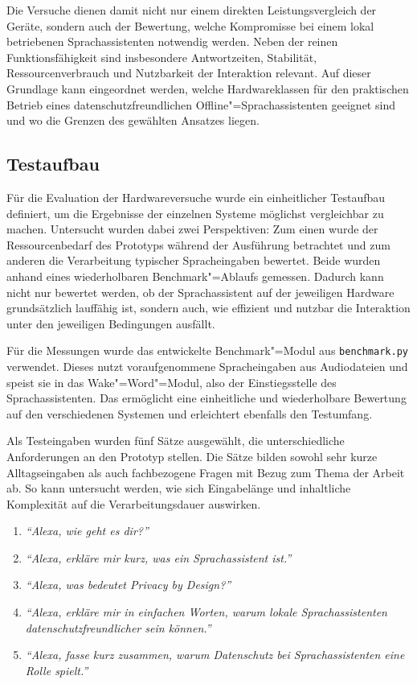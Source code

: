 Die Versuche dienen damit nicht nur einem direkten Leistungsvergleich der Geräte, sondern auch der Bewertung, welche Kompromisse bei einem lokal betriebenen Sprachassistenten notwendig werden. Neben der reinen Funktionsfähigkeit sind insbesondere Antwortzeiten, Stabilität, Ressourcenverbrauch und Nutzbarkeit der Interaktion relevant. Auf dieser Grundlage kann eingeordnet werden, welche Hardwareklassen für den praktischen Betrieb eines datenschutzfreundlichen Offline"=Sprachassistenten geeignet sind und wo die Grenzen des gewählten Ansatzes liegen.


\subsection{Testaufbau}
\label{subsec:Testaufbau}
Für die Evaluation der Hardwareversuche wurde ein einheitlicher Testaufbau definiert, um die Ergebnisse der einzelnen Systeme möglichst vergleichbar zu machen. Untersucht wurden dabei zwei Perspektiven: Zum einen wurde der Ressourcenbedarf des Prototyps während der Ausführung betrachtet und zum anderen die Verarbeitung typischer Spracheingaben bewertet. Beide wurden anhand eines wiederholbaren Benchmark"=Ablaufs gemessen. Dadurch kann nicht nur bewertet werden, ob der Sprachassistent auf der jeweiligen Hardware grundsätzlich lauffähig ist, sondern auch, wie effizient und nutzbar die Interaktion unter den jeweiligen Bedingungen ausfällt.

Für die Messungen wurde das entwickelte Benchmark"=Modul aus \texttt{benchmark.py} verwendet. Dieses nutzt voraufgenommene Spracheingaben aus Audiodateien und speist sie in das Wake"=Word"=Modul, also der Einstiegsstelle des Sprachassistenten. Das ermöglicht eine einheitliche und wiederholbare Bewertung auf den verschiedenen Systemen und erleichtert ebenfalls den Testumfang.

Als Testeingaben wurden fünf Sätze ausgewählt, die unterschiedliche Anforderungen an den Prototyp stellen. Die Sätze bilden sowohl sehr kurze Alltagseingaben als auch fachbezogene Fragen mit Bezug zum Thema der Arbeit ab. So kann untersucht werden, wie sich Eingabelänge und inhaltliche Komplexität auf die Verarbeitungsdauer auswirken.

\begin{enumerate}
  \item \textit{\enquote{Alexa, wie geht es dir?}}
  \item \textit{\enquote{Alexa, erkläre mir kurz, was ein Sprachassistent ist.}}
  \item \textit{\enquote{Alexa, was bedeutet Privacy by Design?}}
  \item \textit{\enquote{Alexa, erkläre mir in einfachen Worten, warum lokale Sprachassistenten datenschutzfreundlicher sein können.}}
  \item \textit{\enquote{Alexa, fasse kurz zusammen, warum Datenschutz bei Sprachassistenten eine Rolle spielt.}}
\end{enumerate}

